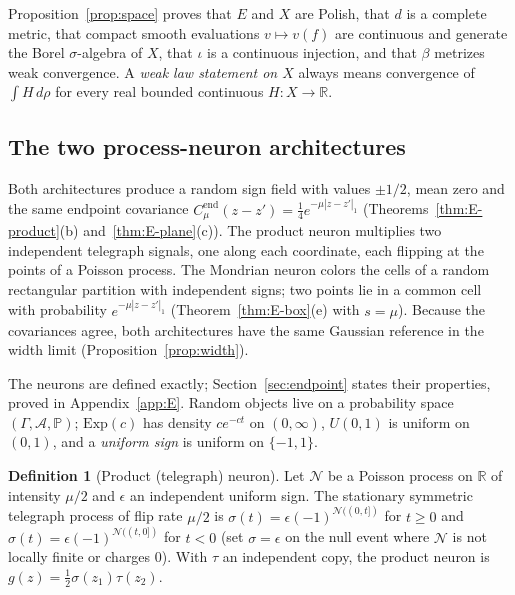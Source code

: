 \documentclass[11pt]{article}
\theoremstyle{plain}
\theoremstyle{definition}
\newtheorem{definition}[theorem]{Definition}
\theoremstyle{remark}
\newcommand{\R}{\mathbb{R}}
\newcommand{\PP}{\mathbb{P}}
\newcommand{\cN}{\mathcal{N}}
\newcommand{\cA}{\mathcal{A}}
\newcommand{\Cend}{C^{\mathrm{end}}_{\mu}}
\begin{document}
Proposition~\ref{prop:space} proves that $E$ and $X$ are Polish, that $d$ is a
complete metric, that compact smooth evaluations $v\mapsto v(f)$ are continuous
and generate the Borel $\sigma$-algebra of $X$, that $\iota$ is a continuous
injection, and that $\beta$ metrizes weak convergence. A \emph{weak law
statement on $X$} always means convergence of $\int H\,d\rho$ for every real
bounded continuous $H:X\to\R$.

\subsection{The two process-neuron architectures}\label{sec:neurons-def}

Both architectures produce a random sign field with values $\pm1/2$, mean zero and the same endpoint covariance $\Cend(z-z')=\tfrac14e^{-\mu|z-z'|_1}$ (Theorems~\ref{thm:E-product}(b) and~\ref{thm:E-plane}(c)). The product neuron multiplies two independent telegraph signals, one along each coordinate, each flipping at the points of a Poisson process. The Mondrian neuron colors the cells of a random rectangular partition with independent signs; two points lie in a common cell with probability $e^{-\mu|z-z'|_1}$ (Theorem~\ref{thm:E-box}(e) with $s=\mu$). Because the covariances agree, both architectures have the same Gaussian reference in the width limit (Proposition~\ref{prop:width}).

The neurons are defined exactly; Section~\ref{sec:endpoint} states their
properties, proved in Appendix~\ref{app:E}. Random objects live on a probability
space $(\Gamma,\cA,\PP)$; $\mathrm{Exp}(c)$ has density $ce^{-ct}$ on
$(0,\infty)$, $U(0,1)$ is uniform on $(0,1)$, and a \emph{uniform sign} is
uniform on $\{-1,1\}$.

\begin{definition}[Product (telegraph) neuron]\label{def:product}
Let $\cN$ be a Poisson process on $\R$ of intensity $\mu/2$ and $\epsilon$ an
independent uniform sign. The stationary symmetric telegraph process of flip
rate $\mu/2$ is $\sigma(t)=\epsilon(-1)^{\cN((0,t])}$ for $t\ge0$ and
$\sigma(t)=\epsilon(-1)^{\cN((t,0])}$ for $t<0$ (set $\sigma=\epsilon$ on the null
event where $\cN$ is not locally finite or charges $0$). With $\tau$ an
independent copy, the product neuron is $g(z)=\tfrac12\sigma(z_1)\tau(z_2)$.
\end{definition}
\end{document}
